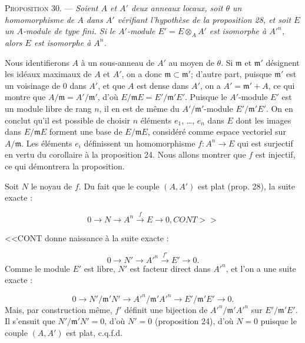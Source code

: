 \textsc{Proposition} 30. --- \emph{Soient $A$ et $A'$ deux anneaux locaux, soit $\theta$ un homomorphisme de $A$ dans $A'$ vérifiant l'hypothèse de la proposition 28, et soit $E$ un $A$-module de type fini. Si le $A'$-module $E' = E \otimes_A A'$ est isomorphe à ${A'}^n$, alors $E$ est isomorphe à $A^n$.}

Nous identifierons $A$ à un sous-anneau de $A'$ au moyen de $\theta$. Si $\mathfrak{m}$ et $\mathfrak{m}'$ désignent les idéaux maximaux de $A$ et $A'$, on a donc $\mathfrak{m} \subset \mathfrak{m}'$; d'autre part, puisque $\mathfrak{m}'$ est un voisinage de $0$ dans $A'$, et que $A$ est dense dans $A'$, on a $A' = \mathfrak{m}' + A$, ce qui montre que $A/\mathfrak{m} = A'/\mathfrak{m}'$, d'où $E/\mathfrak{m}E = E'/\mathfrak{m}'E'$. Puisque le $A'$-module $E'$ est un module libre de rang $n$, il en est de même du $A'/\mathfrak{m}'$-module $E'/\mathfrak{m}'E'$. On en conclut qu'il est possible de choisir $n$ éléments $e_1$, \ldots, $e_n$ dans $E$ dont les images dans $E/\mathfrak{m}E$ forment une base de $E/\mathfrak{m}E$, considéré comme espace vectoriel sur $A/\mathfrak{m}$. Les éléments $e_i$ définissent un homomorphisme $f : A^n \to E$ qui est surjectif en vertu du corollaire à la proposition 24. Nous allons montrer que $f$ est injectif, ce qui démontrera la proposition.

Soit $N$ le noyau de $f$. Du fait que le couple $(A, A')$ est plat (prop. 28), la suite exacte :

\begin{equation*}
0 \to N \to A^n \xrightarrow{\,f\,} E \to 0, CONT>>
\end{equation*}


<<CONT donne naissance à la suite exacte :

\begin{equation*}
0 \longrightarrow N' \longrightarrow A'^n \xrightarrow{\ f'\ } E' \longrightarrow 0.
\end{equation*}
Comme le module $E'$ est libre, $N'$ est facteur direct dans $A'^n$, et l'on a une suite exacte :

\begin{equation*}
0 \longrightarrow N'/\mathfrak{m}'N' \longrightarrow A'^n/\mathfrak{m}'A'^n \longrightarrow E'/\mathfrak{m}'E' \longrightarrow 0.
\end{equation*}
Mais, par construction même, $f'$ définit une bijection de $A'^n/\mathfrak{m}'A'^n$ sur $E'/\mathfrak{m}'E'$. Il s'ensuit que $N'/\mathfrak{m}'N' = 0$, d'où $N' = 0$ (proposition 24), d'où $N = 0$ puisque le couple $(A, A')$ est plat, c.q.f.d.


